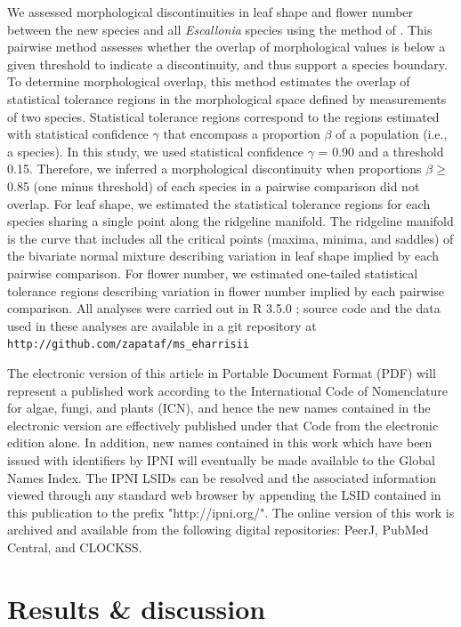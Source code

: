 \documentclass[fleqn,10pt,lineno]{wlpeerj} %
\begin{document}
We assessed morphological discontinuities in leaf shape and flower number between the new species and all \emph{Escallonia} species using the method of \cite{Zapata:2012it}. This pairwise method assesses whether the overlap of morphological values is below a given threshold to indicate a discontinuity, and thus support a species boundary. To determine morphological overlap, this method estimates the overlap of statistical tolerance regions in the morphological space defined by measurements of two species. Statistical tolerance regions correspond to the regions estimated with statistical confidence $\gamma$ that encompass a proportion $\beta$ of a population (i.e., a species). In this study, we used statistical confidence $\gamma$ = 0.90 and a threshold 0.15. Therefore, we inferred a morphological discontinuity when proportions $\beta \geq$  0.85 (one minus threshold) of each species in a pairwise comparison did not overlap. For leaf shape, we estimated the statistical tolerance regions for each species sharing a single point along the ridgeline manifold. The ridgeline manifold is the curve that includes all the critical points (maxima, minima, and saddles) of the bivariate normal mixture describing variation in leaf shape implied by each pairwise comparison. For flower number, we estimated one-tailed statistical tolerance regions describing variation in flower number implied by each pairwise comparison. All analyses were carried out in R 3.5.0 \citep{R-base}; source code and the data used in these analyses are available in a git repository at \texttt{http://github.com/zapataf/ms\_eharrisii}

The electronic version of this article in Portable Document Format (PDF) will represent a published work according to the International Code of Nomenclature for algae, fungi, and plants (ICN), and hence the new names contained in the electronic version are effectively published under that Code from the electronic edition alone. In addition, new names contained in this work which have been issued with identifiers by IPNI will eventually be made available to the Global Names Index. The IPNI LSIDs can be resolved and the associated information viewed through any standard web browser by appending the LSID contained in this publication to the prefix "http://ipni.org/". The online version of this work is archived and available from the following digital repositories: PeerJ, PubMed Central, and CLOCKSS.

\section*{Results \& discussion}
\end{document}
